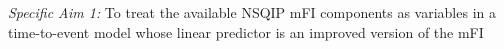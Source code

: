 \emph{Specific Aim 1:} To treat the available NSQIP mFI components as variables in a time-to-event model whose linear predictor is an improved version of the mFI